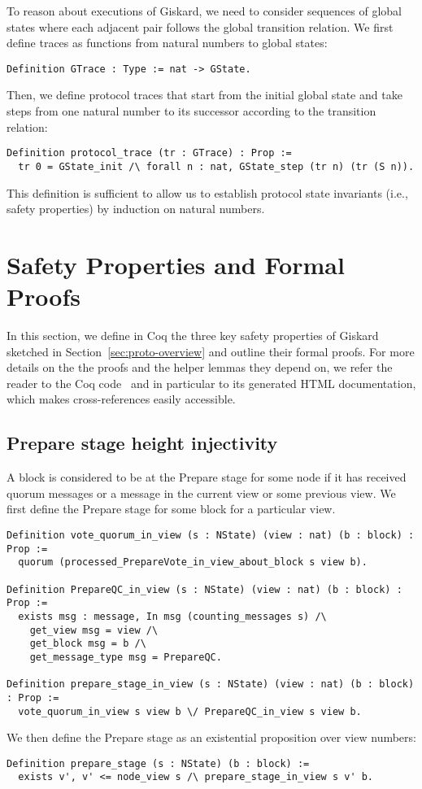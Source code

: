 \documentclass{easychair}
\begin{document}
To reason about executions of Giskard, we need to consider sequences of global states
where each adjacent pair follows the global transition relation. We first define traces as functions from natural numbers to global states:
\begin{lstlisting}[language=Coq]
Definition GTrace : Type := nat -> GState.
\end{lstlisting}
Then, we define protocol traces that start from the initial global state and take steps from one natural number to its successor according to the transition relation:
\begin{lstlisting}[language=Coq]
Definition protocol_trace (tr : GTrace) : Prop :=
  tr 0 = GState_init /\ forall n : nat, GState_step (tr n) (tr (S n)).
\end{lstlisting}
This definition is sufficient to allow us to establish protocol state invariants (i.e., safety properties) by induction on natural numbers.

\section{Safety Properties and Formal Proofs}
\label{sec:safety}

In this section, we define in Coq the three key safety properties of Giskard sketched in Section~\ref{sec:proto-overview} and outline their formal proofs. For more details on the the proofs and the helper lemmas they depend on, we refer the reader to the Coq code~\cite{CoqGiskard} and in particular to its generated HTML documentation, which makes cross-references easily accessible.

\subsection{Prepare stage height injectivity}
A block is considered to be at the Prepare stage for some node if it has received quorum  messages or a  message in the current view or some previous view. We first define the Prepare stage for some block for a particular view.
\begin{lstlisting}[language=Coq]
Definition vote_quorum_in_view (s : NState) (view : nat) (b : block) : Prop :=
  quorum (processed_PrepareVote_in_view_about_block s view b).

Definition PrepareQC_in_view (s : NState) (view : nat) (b : block) : Prop :=
  exists msg : message, In msg (counting_messages s) /\
    get_view msg = view /\
    get_block msg = b /\
    get_message_type msg = PrepareQC.

Definition prepare_stage_in_view (s : NState) (view : nat) (b : block) : Prop :=
  vote_quorum_in_view s view b \/ PrepareQC_in_view s view b.
\end{lstlisting}
We then define the Prepare stage as an existential proposition over view numbers:
\begin{lstlisting}[language=Coq]
Definition prepare_stage (s : NState) (b : block) :=
  exists v', v' <= node_view s /\ prepare_stage_in_view s v' b.
\end{lstlisting}
\end{document}
